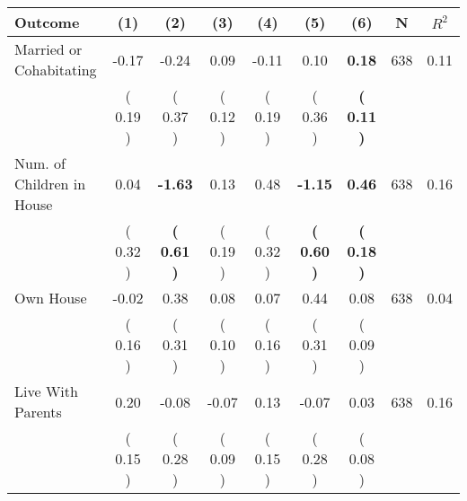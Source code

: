 \begin{tabular}{lcccccccc}
\toprule
 \textbf{Outcome} & \textbf{(1)} & \textbf{(2)} & \textbf{(3)} & \textbf{(4)} & \textbf{(5)} & \textbf{(6)} & \textbf{N} & \textbf{$ R^2$} \\
\midrule
Married or Cohabitating &     -0.17 &     -0.24 &      0.09 &     -0.11 &      0.10 & \textbf{     0.18} & 638 &       0.11 \\ 
 & (     0.19 ) & (     0.37 ) & (     0.12 ) & (     0.19 ) & (     0.36 ) & \textbf{(     0.11 )} & \\
Num. of Children in House &      0.04 & \textbf{    -1.63} &      0.13 &      0.48 & \textbf{    -1.15} & \textbf{     0.46} & 638 &       0.16 \\ 
 & (     0.32 ) & \textbf{(     0.61 )} & (     0.19 ) & (     0.32 ) & \textbf{(     0.60 )} & \textbf{(     0.18 )} & \\
Own House &     -0.02 &      0.38 &      0.08 &      0.07 &      0.44 &      0.08 & 638 &       0.04 \\ 
 & (     0.16 ) & (     0.31 ) & (     0.10 ) & (     0.16 ) & (     0.31 ) & (     0.09 ) & \\
Live With Parents &      0.20 &     -0.08 &     -0.07 &      0.13 &     -0.07 &      0.03 & 638 &       0.16 \\ 
 & (     0.15 ) & (     0.28 ) & (     0.09 ) & (     0.15 ) & (     0.28 ) & (     0.08 ) & \\
\bottomrule
\end{tabular}
